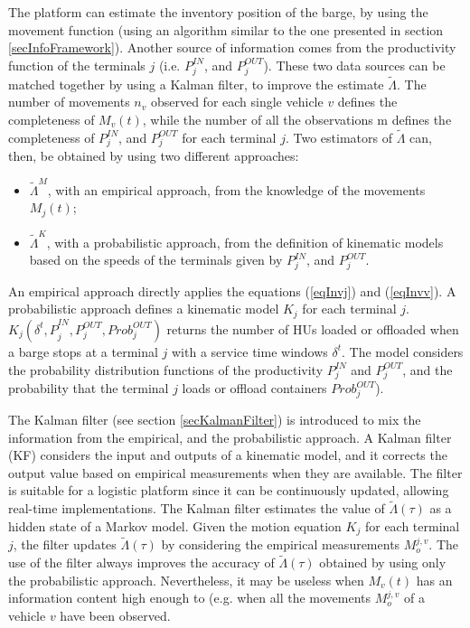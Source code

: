 The platform can estimate the inventory position of the barge, by using the movement function (using an algorithm similar to the one presented in section \ref{secInfoFramework}). Another source of information comes from the productivity function of the terminals $j$ (i.e. $P_j^{IN}$, and $P_j^{OUT}$). These two data sources can be matched together by using a Kalman filter, to improve the estimate $\widetilde{\Lambda}$. The number of movements $n_v$ observed for each single vehicle $v$ defines the completeness of $M_v(t)$, while the number of all the observations m defines the completeness of $P_j^{IN}$, and $P_j^{OUT}$ for each terminal $j$. Two estimators of $\widetilde{\Lambda}$ can, then, be obtained by using two different approaches:

\begin{itemize}
    \item ${\widetilde{\Lambda}}^M$, with an empirical approach, from the knowledge of the movements $M_j\left(t\right)$;
	\item ${\widetilde{\Lambda}}^K$, with a probabilistic approach, from the definition of kinematic models based on the speeds of the terminals given by $P_j^{IN}$, and $P_j^{OUT}$.

\end{itemize}

An empirical approach directly applies the equations (\ref{eqInvj}) and (\ref{eqInvv}). A probabilistic approach defines a kinematic model $K_j$ for each terminal $j$. $K_j({\delta^t,P}_j^{IN},P_j^{OUT},Prob_j^{OUT})$ returns the number of HUs loaded or offloaded when a barge stops at a terminal $j$ with a service time windows $\delta^t$. The model considers the probability distribution functions of the productivity $P_j^{IN}$ and $P_j^{OUT}$, and the probability that the terminal $j$ loads or offload containers $Prob_j^{OUT}$). \par

The Kalman filter (see section \ref{secKalmanFilter}) is introduced to mix the information from the empirical, and the probabilistic approach. A Kalman filter (KF) considers the input and outputs of a kinematic model, and it corrects the output value based on empirical measurements when they are available. The filter is suitable for a logistic platform since it can be continuously updated, allowing real-time implementations. The Kalman filter estimates the value of $\widetilde{\Lambda}(\tau)$ as a hidden state of a Markov model. Given the motion equation $K_j$ for each terminal $j$, the filter updates $\widetilde{\Lambda}\left(\tau\right)$ by considering the empirical measurements $M_o^{j,v}$. The use of the filter always improves the accuracy of $\widetilde{\Lambda}\left(\tau\right)$ obtained by using only the probabilistic approach. Nevertheless, it may be useless when $M_v(t)$ has an information content high enough to (e.g. when all the movements $M_o^{j,v}$ of a vehicle $v$ have been observed. 









